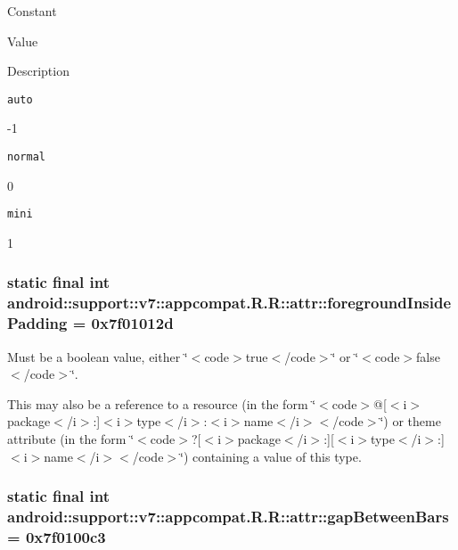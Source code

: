 Constant

Value

Description 

{\tt auto}

-1

{\tt normal}

0

{\tt mini}

1\hypertarget{classandroid_1_1support_1_1v7_1_1appcompat_1_1_r_1_1attr_2bb179bcdaffc9a82f6ae547200dc637}{
\subsubsection[{foregroundInsidePadding}]{\setlength{\rightskip}{0pt plus 5cm}static final int android::support::v7::appcompat.R.R::attr::foregroundInsidePadding = 0x7f01012d}}
\label{classandroid_1_1support_1_1v7_1_1appcompat_1_1_r_1_1attr_2bb179bcdaffc9a82f6ae547200dc637}


Must be a boolean value, either \char`\"{}$<$code$>$true$<$/code$>$\char`\"{} or \char`\"{}$<$code$>$false$<$/code$>$\char`\"{}. 

This may also be a reference to a resource (in the form \char`\"{}$<$code$>$@\mbox{[}$<$i$>$package$<$/i$>$:\mbox{]}$<$i$>$type$<$/i$>$:$<$i$>$name$<$/i$>$$<$/code$>$\char`\"{}) or theme attribute (in the form \char`\"{}$<$code$>$?\mbox{[}$<$i$>$package$<$/i$>$:\mbox{]}\mbox{[}$<$i$>$type$<$/i$>$:\mbox{]}$<$i$>$name$<$/i$>$$<$/code$>$\char`\"{}) containing a value of this type. \hypertarget{classandroid_1_1support_1_1v7_1_1appcompat_1_1_r_1_1attr_ea2f8275f2102d3d220158e4de654aa0}{
\subsubsection[{gapBetweenBars}]{\setlength{\rightskip}{0pt plus 5cm}static final int android::support::v7::appcompat.R.R::attr::gapBetweenBars = 0x7f0100c3}}
\label{classandroid_1_1support_1_1v7_1_1appcompat_1_1_r_1_1attr_ea2f8275f2102d3d220158e4de654aa0}


